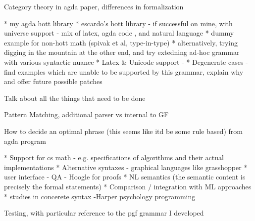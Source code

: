 
Category theory in agda paper, differences in formalization

* my agda hott library
* escardo's hott library 
  - if successful on mine, with universe support
  - mix of latex, agda code , and natural language 
* dummy example for non-hott math (spivak et al, type-in-type)
* alternatively, trying digging in the mountain at the other end, and try extedning ad-hoc grammar with various syntactic nuance
* Latex & Unicode support  - 
* Degenerate cases
  - find examples which are unable to be supported by this grammar, explain why and offer future possible patches

Talk about all the things that need to be done

Pattern Matching, additional parser vs internal to GF

How to decide an optimal phrase (this seems like itd be some rule based) from agda program

* Support for cs math - e.g. specifications of algorithms and their actual implementations
* Alternative syntaxes - graphical languages like grasshopper
* user interface
  - QA
  - Hoogle for proofs
* NL semantics (the semantic content is precisely the formal statements)
* Comparison / integration with ML approaches
* studies in concerete syntax -Harper psychology {\intersect} programming

Testing, with particular reference to the pgf grammar I developed


